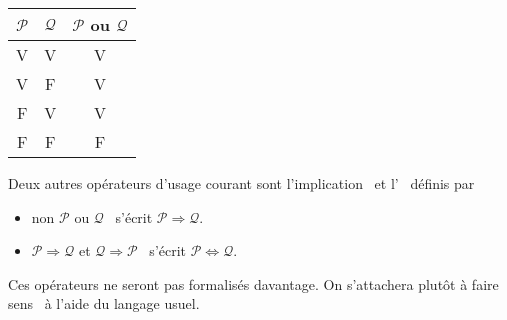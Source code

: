 \begin{description}
\begin{center}
\begin{tabular}{|c|c|c|}
\hline
$\mathcal{P}$ & $\mathcal{Q}$ & $\mathcal{P}$ ou $\mathcal{Q}$ \\ \hline
V             & V             &   V  \\ \hline
V             & F             &   V  \\ \hline
F             & V             &   V  \\ \hline
F             & F             &   F  \\ \hline
 \end{tabular} 
\hspace*{2cm}
\end{center}
Deux autres opérateurs d'usage courant sont l'\og implication\fg~ et l'\fg~ définis par
\begin{itemize}
  \item \og non $\mathcal{P}$ ou $\mathcal{Q}$\fg~ s'écrit \og $\mathcal{P} \Rightarrow \mathcal{Q}$\fg.
  \item \og $\mathcal{P} \Rightarrow \mathcal{Q}$ et $\mathcal{Q} \Rightarrow \mathcal{P}$\fg~ s'écrit \og $\mathcal{P} \Leftrightarrow \mathcal{Q}$\fg.
\end{itemize}
Ces opérateurs ne seront pas formalisés davantage. On s'attachera plutôt à \og faire sens\fg~ à l'aide du langage usuel.
\end{description}

